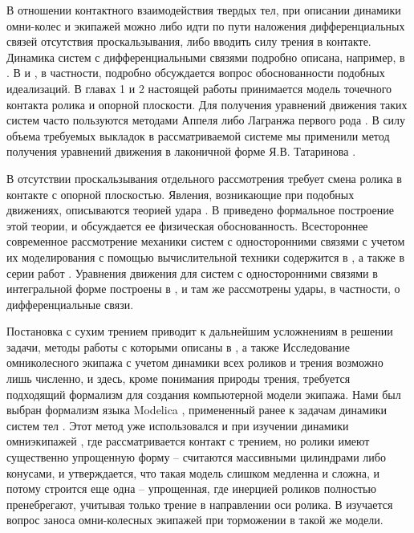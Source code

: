 В отношении контактного взаимодействия твердых тел, при описании динамики омни-колес и экипажей можно либо идти по пути наложения дифференциальных связей отсутствия проскальзывания, либо вводить силу трения в контакте. Динамика систем с дифференциальными связями подробно описана, например, в \cite{Chaplygin1949,NejmarkFufaev1967}. В \cite{NejmarkFufaev1967} и \cite{karapetyan1981negolonom}, в частности, подробно обсуждается вопрос обоснованности подобных идеализаций. В главах 1 и 2 настоящей работы принимается модель точечного контакта ролика и опорной плоскости. Для получения уравнений движения таких систем часто пользуются методами Аппеля либо Лагранжа первого рода \cite{KarapetyanKugushev2010,Appel1,AppelTwo1960}. В силу объема требуемых выкладок в рассматриваемой системе мы применили метод получения уравнений движения в лаконичной форме Я.В. Татаринова \cite{Tatarinov,Tatarinov2005}.

В отсутствии проскальзывания отдельного рассмотрения требует смена ролика в контакте с опорной плоскостью. Явления, возникающие при подобных движениях, описываются теорией удара \cite{AppelTwo1960,Vilke,KozlovTreshevBilliardsBook1991}. В \cite{KozlovTreshevBilliardsBook1991} приведено формальное построение этой теории, и обсуждается ее физическая обоснованность. Всестороннее современное рассмотрение механики систем с односторонними связями с учетом их моделирования с помощью вычислительной техники содержится в \cite{BrogliatoBook1999}, а также в серии работ \cite{PfeifferGlockerBook,PfeifferGlocker1995,Pfeiffer1999a,PfeifferGlockerSymposium1999,Pfeiffer1997,Glocker1999,Pfeiffer2001,Brogliato2002,Pfeiffer2003,FloresGlocker2011,Zbiciak2014}. Уравнения движения для систем с односторонними связями в интегральной форме построены в \cite{Kugushev2003}, и там же рассмотрены удары, в частности, о дифференциальные связи.

Постановка с сухим трением приводит к дальнейшим усложнениям в решении задачи, методы работы с которыми описаны в \cite{PfeifferGlocker1993,Pfeiffer1996,Anitescu1997,Lacoursiere2011,Charles2014,Paoli2015,Moreau1988}, а также \cite{Novozhilov1991} Исследование омниколесного экипажа с учетом динамики всех роликов и трения возможно лишь численно, и здесь, кроме понимания природы трения, требуется подходящий формализм для создания компьютерной модели экипажа. Нами был выбран формализм языка Modelica \cite{ModelicaSpec,Dymola,Fritzson}, примененный ранее к задачам динамики систем тел \cite{Kosenko1998,KosenkoQuaternionRus,Kosenko2006unilat,Kosenko2006,Kosenko2007,KosenkoGraphs2009,KosenkoGusev2012,KosenkoRolling,Kosenko2006,KosenkoAlexandrov,KosenkoKuznetzova}. Этот метод уже использовался и при изучении динамики омниэкипажей \cite{Kalman2012assistant,Kalman2013control,Kalman2013braking,Kalman2013practical}, где рассматривается контакт с трением, но ролики имеют существенно упрощенную форму -- считаются массивными цилиндрами либо конусами, и утверждается, что такая модель слишком медленна и сложна, и потому строится еще одна -- упрощенная, где инерцией роликов полностью пренебрегают, учитывая только трение в направлении оси ролика. В \cite{Kalman2013braking} изучается вопрос заноса омни-колесных экипажей при торможении в такой же модели.

